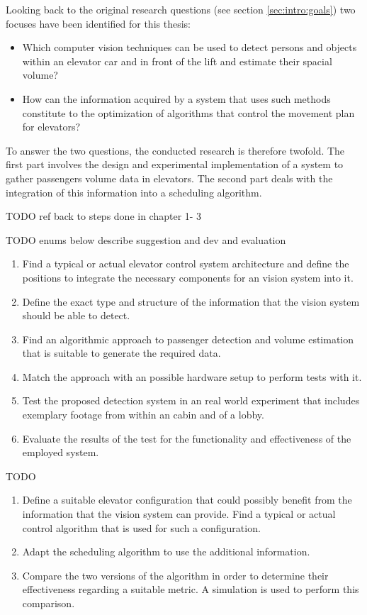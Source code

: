 Looking back to the original research questions (see section \vref{sec:intro:goals}) two focuses have been identified for this thesis:

\begin{itemize}
    \item Which computer vision techniques can be used to detect persons and objects within an elevator car and in front of the lift and estimate their spacial volume?
    \item How can the information acquired by a system that uses such methods constitute to the optimization of algorithms that control the movement plan for elevators?
\end{itemize}

To answer the two questions, the conducted research is therefore twofold.
The first part involves the design and experimental implementation of a system to gather passengers volume data in elevators.
The second part deals with the integration of this information into a scheduling algorithm.

TODO ref back to steps done in chapter 1- 3

TODO enums below describe suggestion and dev and evaluation

\begin{enumerate}
    \item Find a typical or actual elevator control system architecture and define the positions to integrate the necessary components for an vision system into it.
    \item Define the exact type and structure of the information that the vision system should be able to detect.
    \item Find an algorithmic approach to  passenger detection and volume estimation that is suitable to generate the required data.
    \item Match the approach with an possible hardware setup to perform tests with it.
    \item Test the proposed detection system in an real world experiment that includes  exemplary footage from within an cabin and of a lobby.
    \item Evaluate the results of the test for the functionality and effectiveness of the employed system.
\end{enumerate}

TODO

\begin{enumerate}
    \item Define a suitable elevator configuration that could possibly benefit from the information that the vision system can provide. 
    Find a typical or actual control algorithm that is used for such a configuration.
    \item Adapt the scheduling algorithm to use the additional information.
    \item Compare the two versions of the algorithm in order to determine their effectiveness regarding a suitable metric.
    A simulation is used to perform this comparison.
\end{enumerate}

